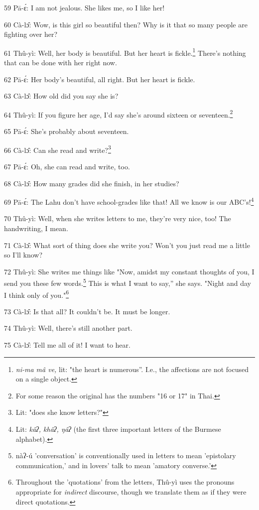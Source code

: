 59 Pā-ɛ́: I am not jealous. She likes me, so I like her!

60 Cà-lɔ̂: Wow, is this girl so beautiful then? Why is it that so many people
are fighting over her?

61 Thû-yì: Well, her body is beautiful. But her heart is fickle.\footnote{\textit{ni-ma mâ ve,} lit: "the heart is numerous''. I.e., the affections are not focused on a single object.} There's
nothing that can be done with her right now.

62 Pā-ɛ́: Her body's beautiful, all right. But her heart is fickle.

63 Cà-lɔ̂: How old did you say she is?

64 Thû-yì: If you figure her age, I'd say she's around sixteen or seventeen.\footnote{For some reason the original has the numbers "16 or 17" in Thai.}

65 Pā-ɛ́: She's probably about seventeen.

66 Cà-lɔ̂: Can she read and write?\footnote{Lit: "does she know letters?"}

67 Pā-ɛ́: Oh, she can read and write, too.

68 Cà-lɔ̂: How many grades did she finish, in her studies?

69 Pā-ɛ́: The Lahu don't have school-grades like that! All we know is our ABC's!\footnote{Lit: \textit{kâʔ, khâʔ, ŋâʔ} (the first three important letters of the Burmese alphabet).}

70 Thû-yì: Well, when she writes letters to me, they're very nice, too! The handwriting,
I mean.

71 Cà-lɔ̂: What sort of thing does she write you? Won't you just read me a little
so I'll know?

72 Thû-yì: She writes me things like "Now, amidst my constant thoughts
of you, I send you these few words.\footnote{nàʔ-ú 'conversation' is conventionally used in letters to mean 'epistolary communication,' and in lovers' talk to mean 'amatory converse.'} This is what I want to say,'' she says.
"Night and day I think only of you."\footnote{Throughout the 'quotations' from the letters, Thû-yì uses the pronouns appropriate for\textit{ indirect }discourse, though we translate them as if they were direct quotations.}

73 Cà-lɔ̂: Is that all? It couldn't be. It must be longer.

74 Thû-yì: Well, there's still another part.

75 Cà-lɔ̂: Tell me all of it! I want to hear.

